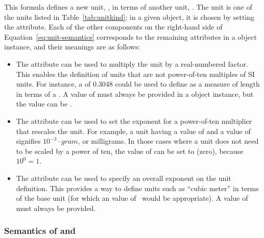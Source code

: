 This formula defines a new unit, \unew, in terms of another unit,
\ukind.  The unit \ukind is one of the units listed in
Table~\ref{tab:unitkind}; in a given \Unit object, it is
chosen by setting the  attribute.  Each of the other
components on the right-hand side of
Equation~\ref{eq:unit-semantics} corresponds to the remaining
attributes in a \Unit object instance, and their meanings are as
follows:
\begin{itemize}

\item The  attribute can be used to multiply the
   unit by a real-numbered factor.  This enables the
  definition of units that are not power-of-ten multiples of SI
  units.  For instance, a  of 0.3048 could be
  used to define  as a measure of length in terms of a
  .  A value of  must always be
  provided in a \Unit object instance, but the value can be
  .

\item The  attribute can be used to set the exponent
  for a power-of-ten multiplier that rescales the unit.  For
  example, a unit having a  value of  and a
   value of  signifies $10^{-3} \cdot gram$,
  or milligrams.  In those cases where a unit does not need to be
  scaled by a power of ten, the value of  can be set
  to  (zero), because $10^0 = 1$.

\item The  attribute can be used to specify an
  overall exponent on the unit definition.  This provides a way to
  define units such as ``cubic meter'' in terms of the base unit
   (for which an  value of~
  would be appropriate).  A value of  must always
  be provided.

\end{itemize}


\subsubsection{Semantics of  and }
\label{sec:unit-structure:semantics}

